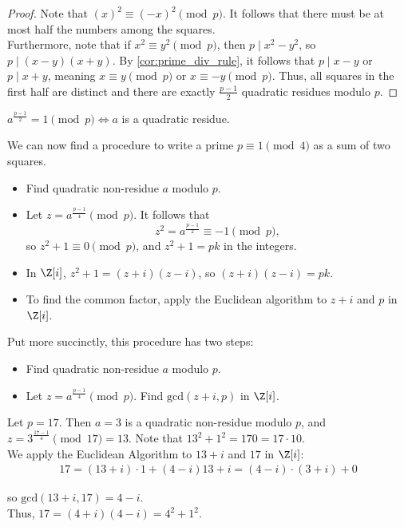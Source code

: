 \documentclass[11pt]{article}
\begin{document}
\begin{proof}
Note that $(x)^2 \equiv (-x)^2 \pmod p$. It follows that there must be at most half the numbers among the squares. \\

Furthermore, note that if $x^2 \equiv y^2 \pmod p$, then $p \mid x^2 - y^2$, so $p \mid (x-y)(x+y)$. By \cref{cor:prime_div_rule}, it follows that
$p \mid x-y$ or $p \mid x+y$, meaning $x \equiv y \pmod p$ or $x \equiv -y \pmod p$. Thus, all squares in the first half are distinct and there are exactly
$\frac{p-1}{2}$ quadratic residues modulo $p$.
\end{proof}

\begin{remark}
$a^{\frac{p-1}{2}} = 1 \pmod p \iff a$ is a quadratic residue.
\end{remark}

We can now find a procedure to write a prime $p \equiv 1 \pmod 4$ as a sum of two squares.
\begin{itemize}
    \item Find quadratic non-residue $a$ modulo $p$.
    \item Let $z = a^{\frac{p-1}{4}} \pmod p.$ It follows that 
    \[
        z^2 = a^{\frac{p-1}{2}} \equiv -1 \pmod p,
    \]
    so $z^2 + 1 \equiv 0 \pmod p$, and $z^2 + 1 = pk$ in the integers.
    \item In $\Z[i]$, $z^2 + 1 = (z+i)(z-i)$, so $(z+i)(z-i) = pk.$
    \item To find the common factor, apply the Euclidean algorithm to $z+i$ and $p$ in $\Z[i]$.
\end{itemize}

Put more succinctly, this procedure has two steps:
\begin{itemize}
    \item Find quadratic non-residue $a$ modulo $p$.
    \item Let $z = a^{\frac{p-1}{4}} \pmod p.$ Find $\mathrm{gcd}(z+i, p)$ in $\Z[i]$. 
\end{itemize} 

\begin{eg}
Let $p = 17$. Then $a = 3$ is a quadratic non-residue modulo $p$, and $z = 3^{\frac{17-1}{4}} \pmod{17} = 13.$ Note that $13^2 + 1^2 = 170 = 17 \cdot 10.$ \\

We apply the Euclidean Algorithm to $13+i$ and $17$ in $\Z[i]$:
\begin{align*}
    17 = (13+i) \cdot 1 + (4-i)
    13+i = (4-i) \cdot (3+i) + 0
\end{align*}

so $\mathrm{gcd}(13+i, 17) = 4-i$. \\

Thus, $17 = (4+i)(4-i) = \boxed{4^2 + 1^2}.$
\end{eg}
\end{document}
